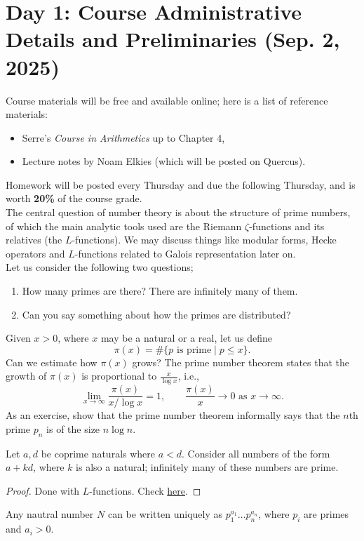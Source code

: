\section{Day 1: Course Administrative Details and Preliminaries (Sep. 2, 2025)}
Course materials will be free and available online; here is a list of reference materials:
\begin{itemize}
    \item Serre's \textit{Course in Arithmetics} up to Chapter 4,
    \item Lecture notes by Noam Elkies (which will be posted on Quercus).
\end{itemize}
Homework will be posted every Thursday and due the following Thursday, and is worth \textbf{20\%} of the course grade.
\\[8pt]
The central question of number theory is about the structure of prime numbers, of which the main analytic tools used are the Riemann $\zeta$-functions and its relatives (the $L$-functions). We may discuss things like modular forms, Hecke operators and $L$-functions related to Galois representation later on.
\\[8pt]
Let us consider the following two questions;
\begin{enumerate}[label=(\alph*)]
    \item How many primes are there? There are infinitely many of them.
    \item Can you say something about how the primes are distributed?
\end{enumerate}
Given $x > 0$, where $x$ may be a natural or a real, let us define
\[ \pi(x) = \#\{p \text{ is prime} \mid p \leq x\}. \]
Can we estimate how $\pi(x)$ grows? The prime number theorem states that the growth of $\pi(x)$ is proportional to $\frac{x}{\log x}$, i.e.,
\[ \lim_{x \to \infty} \frac{\pi(x)}{x / \log x} = 1, \qquad \frac{\pi(x)}{x} \to 0 \text{ as } x \to \infty. \]
As an exercise, show that the prime number theorem informally says that the $n$th prime $p_n$ is of the size $n \log n$.
\begin{theorem}
    Let $a, d$ be coprime naturals where $a < d$. Consider all numbers of the form $a + kd$, where $k$ is also a natural; infinitely many of these numbers are prime.
\end{theorem}
\begin{proof}
    Done with $L$-functions. Check \href{https://math.stackexchange.com/a/4711381}{here}.
\end{proof}
\begin{theorem}
    Any nautral number $N$ can be written uniquely as $p_1^{a_1} \dots p_n^{a_n}$, where $p_i$ are primes and $a_i > 0$.
\end{theorem}
